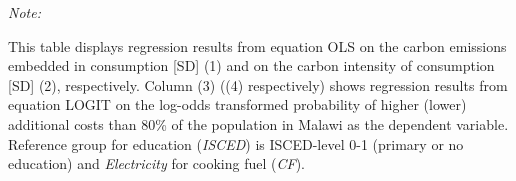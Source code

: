\begin{table}[htbp!]
\begin{adjustbox}{width = 1\textwidth, max height = 0.95\textheight, center}
\begin{threeparttable}[b]
         \begin{tablenotes}\item \medskip \textit{Note:}
            \item This table displays regression results from equation OLS on the carbon emissions embedded in consumption [SD] (1) and on the carbon intensity of consumption [SD] (2), respectively. 
                                      Column (3) ((4) respectively) shows regression results from equation LOGIT on the log-odds transformed probability of higher (lower) additional costs than 80\% of the population in Malawi as the dependent variable. Reference group for education (\textit{ISCED}) is ISCED-level 0-1 (primary or no education) and \textit{Electricity} for cooking fuel (\textit{CF}).
         \end{tablenotes}
      \end{threeparttable}
   \end{adjustbox}
\end{table}


